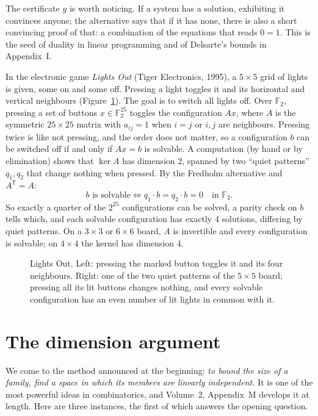 The certificate $y$ is worth noticing. If a system has a solution, exhibiting it convinces anyone; the alternative says
that if it has none, there is also a short convincing proof of that: a combination of the equations that reads $0=1$.
This is the seed of duality in linear programming  and of Delsarte's bounds in Appendix~I.

\begin{example}\label{linear:ex:lightsout}
In the electronic game \emph{Lights Out} (Tiger Electronics, 1995), a $5\times5$ grid of lights is given, some on and
some off. Pressing a light toggles it and its horizontal and vertical neighbours (Figure~\ref{linear:fig:lightsout}). The goal
is to switch all lights off. Over $\mathbb F_2$, pressing a set of buttons $x\in\mathbb F_2^{25}$ toggles the
configuration $Ax$, where $A$ is the symmetric $25\times25$ matrix with $a_{ij}=1$ when $i=j$ or $i,j$ are neighbours.
Pressing twice is like not pressing, and the order does not matter, so a configuration $b$ can be switched off if and only
if $Ax=b$ is solvable. A computation (by hand or by elimination) shows that $\ker A$ has dimension $2$,
spanned by two ``quiet patterns'' $q_1,q_2$ that change nothing when pressed. By the Fredholm alternative and
$A^{\mathsf T}=A$:
\[
b\text{ is solvable}\iff q_1\cdot b=q_2\cdot b=0\quad\text{in }\mathbb F_2.
\]
So exactly a quarter of the $2^{25}$ configurations can be solved, a parity check on $b$ tells which, and each solvable
configuration has exactly $4$ solutions, differing by quiet patterns. On a $3\times3$ or $6\times6$ board, $A$ is
invertible and every configuration is solvable; on $4\times4$ the kernel has dimension $4$.
\end{example}

\begin{figure}[ht]
\centering
{}
\caption{Lights Out. Left: pressing the marked button toggles it and its four neighbours. Right: one of the two quiet
patterns of the $5\times5$ board; pressing all its lit buttons changes nothing, and every solvable configuration has an
even number of lit lights in common with it.}
\label{linear:fig:lightsout}
\end{figure}

\section{The dimension argument}\label{linear:sec:dimarg}

We come to the method announced at the beginning: \emph{to bound the size of a family, find a space in which its
members are linearly independent.} It is one of the most powerful ideas in combinatorics, and Volume~2, Appendix~M
develops it at length. Here are three instances, the first of which answers the opening question.

